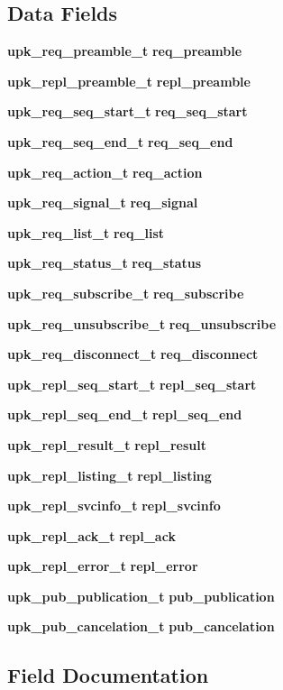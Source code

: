 \subsection*{Data Fields}
\begin{DoxyCompactItemize}
\item 
{\bf upk\_\-req\_\-preamble\_\-t} {\bf req\_\-preamble}
\item 
{\bf upk\_\-repl\_\-preamble\_\-t} {\bf repl\_\-preamble}
\item 
{\bf upk\_\-req\_\-seq\_\-start\_\-t} {\bf req\_\-seq\_\-start}
\item 
{\bf upk\_\-req\_\-seq\_\-end\_\-t} {\bf req\_\-seq\_\-end}
\item 
{\bf upk\_\-req\_\-action\_\-t} {\bf req\_\-action}
\item 
{\bf upk\_\-req\_\-signal\_\-t} {\bf req\_\-signal}
\item 
{\bf upk\_\-req\_\-list\_\-t} {\bf req\_\-list}
\item 
{\bf upk\_\-req\_\-status\_\-t} {\bf req\_\-status}
\item 
{\bf upk\_\-req\_\-subscribe\_\-t} {\bf req\_\-subscribe}
\item 
{\bf upk\_\-req\_\-unsubscribe\_\-t} {\bf req\_\-unsubscribe}
\item 
{\bf upk\_\-req\_\-disconnect\_\-t} {\bf req\_\-disconnect}
\item 
{\bf upk\_\-repl\_\-seq\_\-start\_\-t} {\bf repl\_\-seq\_\-start}
\item 
{\bf upk\_\-repl\_\-seq\_\-end\_\-t} {\bf repl\_\-seq\_\-end}
\item 
{\bf upk\_\-repl\_\-result\_\-t} {\bf repl\_\-result}
\item 
{\bf upk\_\-repl\_\-listing\_\-t} {\bf repl\_\-listing}
\item 
{\bf upk\_\-repl\_\-svcinfo\_\-t} {\bf repl\_\-svcinfo}
\item 
{\bf upk\_\-repl\_\-ack\_\-t} {\bf repl\_\-ack}
\item 
{\bf upk\_\-repl\_\-error\_\-t} {\bf repl\_\-error}
\item 
{\bf upk\_\-pub\_\-publication\_\-t} {\bf pub\_\-publication}
\item 
{\bf upk\_\-pub\_\-cancelation\_\-t} {\bf pub\_\-cancelation}
\end{DoxyCompactItemize}


\subsection{Field Documentation}
